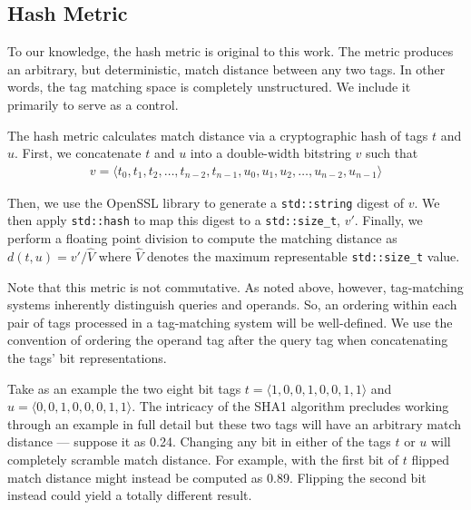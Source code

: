 \subsection{Hash Metric} \label{sec:hash}

To our knowledge, the hash metric is original to this work.
The metric produces an arbitrary, but deterministic, match distance between any two tags.
In other words, the tag matching space is completely unstructured.
We include it primarily to serve as a control.

The hash metric calculates match distance via a cryptographic hash of tags $t$ and $u$.
First, we concatenate $t$ and $u$ into a double-width bitstring $v$ such that
\begin{align*}
v = \langle t_0, t_1, t_2, \dots, t_{n-2}, t_{n-1}, u_0, u_1, u_2, \dots, u_{n-2}, u_{n-1} \rangle
\end{align*}

Then, we use the OpenSSL library to generate a \texttt{std::string} digest of $v$.
We then apply \texttt{std::hash} to map this digest to a \texttt{std::size\_t}, $v'$.
Finally, we perform a floating point division to compute the matching distance as $d(t, u) = v' / \hat{V}$ where $\hat{V}$  denotes the maximum representable \texttt{std::size\_t} value.

Note that this metric is not commutative.
As noted above, however, tag-matching systems inherently distinguish queries and operands.
So, an ordering within each pair of tags processed in a tag-matching system will be well-defined.
We use the convention of ordering the operand tag after the query tag when concatenating the tags' bit representations.

Take as an example the two eight bit tags $t = \langle 1, 0, 0, 1, 0, 0, 1, 1 \rangle$ and $u = \langle 0, 0, 1, 0, 0, 0, 1, 1 \rangle$.
The intricacy of the SHA1 algorithm precludes working through an example in full detail but these two tags will have an arbitrary match distance --- suppose it as 0.24.
Changing any bit in either of the tags $t$ or $u$ will completely scramble match distance.
For example, with the first bit of $t$ flipped match distance might instead be computed as 0.89.
Flipping the second bit instead could yield a totally different result.
